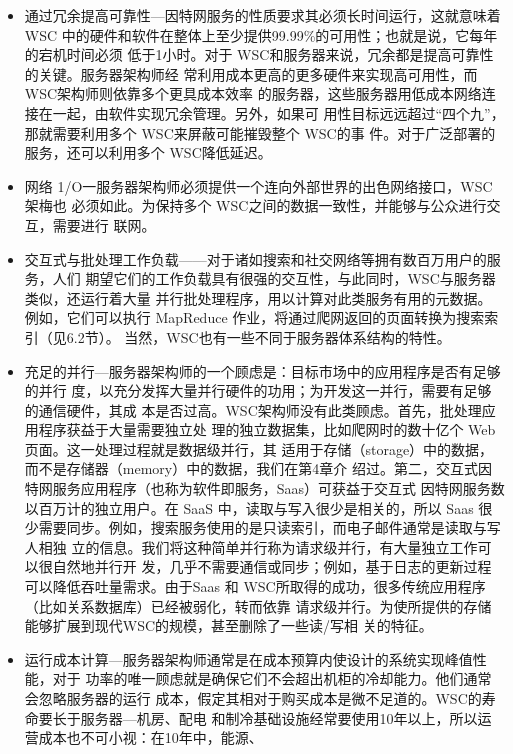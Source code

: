 \begin{itemize}
    \item 通过冗余提高可靠性—因特网服务的性质要求其必须长时间运行，这就意味着 WSC
    中的硬件和软件在整体上至少提供99.99\%的可用性；也就是说，它每年的宕机时间必须
    低于1小时。对于 WSC和服务器来说，冗余都是提高可靠性的关键。服务器架构师经
    常利用成本更高的更多硬件来实现高可用性，而WSC架构师则依靠多个更具成本效率
    的服务器，这些服务器用低成本网络连接在一起，由软件实现冗余管理。另外，如果可
    用性目标远远超过“四个九”，那就需要利用多个 WSC来屏蔽可能摧毁整个 WSC的事
    件。对于广泛部署的服务，还可以利用多个 WSC降低延迟。
    \item 网络 1/O一服务器架构师必须提供一个连向外部世界的出色网络接口，WSC架梅也
    必须如此。为保持多个 WSC之间的数据一致性，并能够与公众进行交互，需要进行
    联网。
    \item 交互式与批处理工作负载——对于诸如搜索和社交网络等拥有数百万用户的服务，人们
    期望它们的工作负载具有很强的交互性，与此同时，WSC与服务器类似，还运行着大量
    并行批处理程序，用以计算对此类服务有用的元数据。例如，它们可以执行 MapReduce
    作业，将通过爬网返回的页面转换为搜索索引（见6.2节）。
    当然，WSC也有一些不同于服务器体系结构的特性。
    \item 充足的并行—服务器架构师的一个顾虑是：目标市场中的应用程序是否有足够的并行
    度，以充分发挥大量并行硬件的功用；为开发这一并行，需要有足够的通信硬件，其成
    本是否过高。WSC架构师没有此类顾虑。首先，批处理应用程序获益于大量需要独立处
    理的独立数据集，比如爬网时的数十亿个 Web 页面。这一处理过程就是数据级并行，其
    适用于存储（storage）中的数据，而不是存储器（memory）中的数据，我们在第4章介
    绍过。第二，交互式因特网服务应用程序（也称为软件即服务，Saas）可获益于交互式
    因特网服务数以百万计的独立用户。在 SaaS 中，读取与写入很少是相关的，所以 Saas
    很少需要同步。例如，搜索服务使用的是只读索引，而电子邮件通常是读取与写人相独
    立的信息。我们将这种简单并行称为请求级并行，有大量独立工作可以很自然地并行开
    发，几乎不需要通信或同步；例如，基于日志的更新过程可以降低吞吐量需求。由于Saas
    和 WSC所取得的成功，很多传统应用程序（比如关系数据库）已经被弱化，转而依靠
    请求级并行。为使所提供的存储能够扩展到现代WSC的规模，甚至删除了一些读/写相
    关的特征。
    \item 运行成本计算—服务器架构师通常是在成本预算内使设计的系统实现峰值性能，对于
    功率的唯一顾虑就是确保它们不会超出机柜的冷却能力。他们通常会忽略服务器的运行
    成本，假定其相对于购买成本是微不足道的。WSC的寿命要长于服务器—机房、配电
    和制冷基础设施经常要使用10年以上，所以运营成本也不可小视：在10年中，能源、

\end{itemize}
